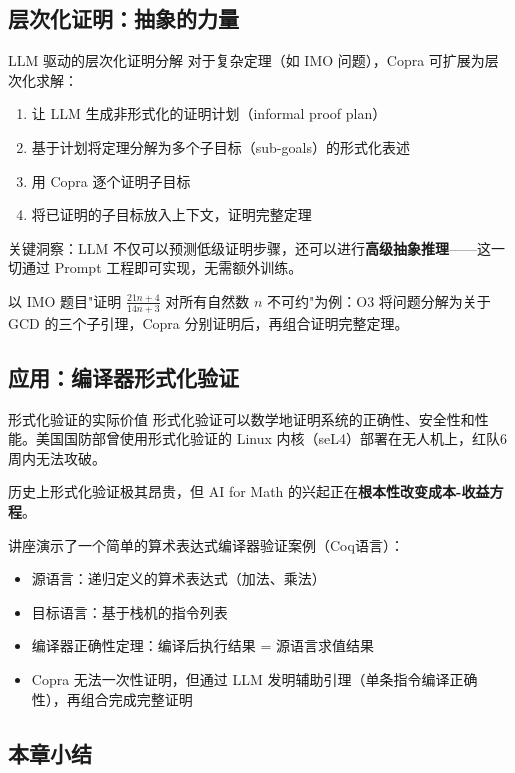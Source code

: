 \documentclass[a4paper]{article}
\begin{document}
\subsection{层次化证明：抽象的力量}

\begin{importantbox}{LLM 驱动的层次化证明分解}
对于复杂定理（如 IMO 问题），Copra 可扩展为层次化求解：
\begin{enumerate}
    \item 让 LLM 生成非形式化的证明计划（informal proof plan）
    \item 基于计划将定理分解为多个子目标（sub-goals）的形式化表述
    \item 用 Copra 逐个证明子目标
    \item 将已证明的子目标放入上下文，证明完整定理
\end{enumerate}
关键洞察：LLM 不仅可以预测低级证明步骤，还可以进行\textbf{高级抽象推理}——这一切通过 Prompt 工程即可实现，无需额外训练。
\end{importantbox}

以 IMO 题目"证明 $\frac{21n+4}{14n+3}$ 对所有自然数 $n$ 不可约"为例：O3 将问题分解为关于 GCD 的三个子引理，Copra 分别证明后，再组合证明完整定理。

\subsection{应用：编译器形式化验证}

\begin{knowledgebox}{形式化验证的实际价值}
形式化验证可以数学地证明系统的正确性、安全性和性能。美国国防部曾使用形式化验证的 Linux 内核（seL4）部署在无人机上，红队6周内无法攻破。

历史上形式化验证极其昂贵，但 AI for Math 的兴起正在\textbf{根本性改变成本-收益方程}。
\end{knowledgebox}

讲座演示了一个简单的算术表达式编译器验证案例（Coq语言）：
\begin{itemize}
    \item 源语言：递归定义的算术表达式（加法、乘法）
    \item 目标语言：基于栈机的指令列表
    \item 编译器正确性定理：编译后执行结果 = 源语言求值结果
    \item Copra 无法一次性证明，但通过 LLM 发明辅助引理（单条指令编译正确性），再组合完成完整证明
\end{itemize}

\subsection{本章小结}
\end{document}
